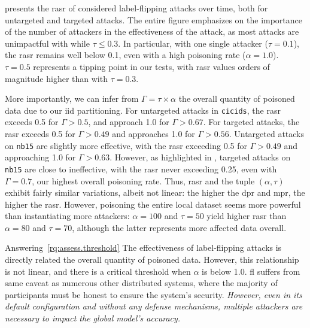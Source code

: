  presents the \gls{rasr} of considered label-flipping attacks over time, both for untargeted and targeted attacks.
The entire figure emphasizes on the importance of the number of attackers in the effectiveness of the attack, as most attacks are unimpactful with while $\tau \leq 0.3$.
In particular, with one single attacker ($\tau=0.1$), the \gls{rasr} remains well below 0.1, even with a high poisoning rate ($\alpha=1.0$).
$\tau=0.5$ represents a tipping point in our tests, with \gls{rasr} values orders of magnitude higher than with $\tau=0.3$.

More importantly, we can infer from $\Gamma=\tau\times\alpha$ the overall quantity of poisoned data due to our \gls{iid} partitioning.
For untargeted attacks in \texttt{cicids}, the \gls{rasr} exceeds 0.5 for $\Gamma>0.5$, and approach 1.0 for $\Gamma>0.67$.
For targeted attacks, the \gls{rasr} exceeds 0.5 for $\Gamma>0.49$ and approaches 1.0 for  $\Gamma>0.56$.
Untargeted attacks on \texttt{nb15} are slightly more effective, with the \gls{rasr} exceeding 0.5 for $\Gamma>0.49$ and approaching 1.0 for $\Gamma>0.63$.
However, as highlighted in , targeted attacks on \texttt{nb15} are close to ineffective, with the \gls{rasr} never exceeding 0.25, even with $\Gamma=0.7$, our highest overall poisoning rate.
Thus, \gls{rasr} and the tuple $(\alpha, \tau)$ exhibit fairly similar variations, albeit not linear: the higher the \gls{dpr} and \gls{mpr}, the higher the \gls{rasr}.
However, poisoning the entire local dataset seems more powerful than instantiating more attackers: $\alpha=100$ and $\tau=50$ yield higher \gls{rasr} than $\alpha=80$ and $\tau=70$, although the latter represents more affected data overall.

\begin{answerbox}{Answering~\ref{rq:assess.threshold} \normalfont\itshape\rqthreshold}
  The effectiveness of label-flipping attacks is directly related the overall quantity of poisoned data.
  However, this relationship is not linear, and there is a critical threshold when $\alpha$ is below 1.0.
  \Gls{fl} suffers from same caveat as numerous other distributed systems, where the majority of participants must be honest to ensure the system's security.
  \emph{However, even in its default configuration and without any defense mechanisms, multiple attackers are necessary to impact the global model's accuracy.}
\end{answerbox}




